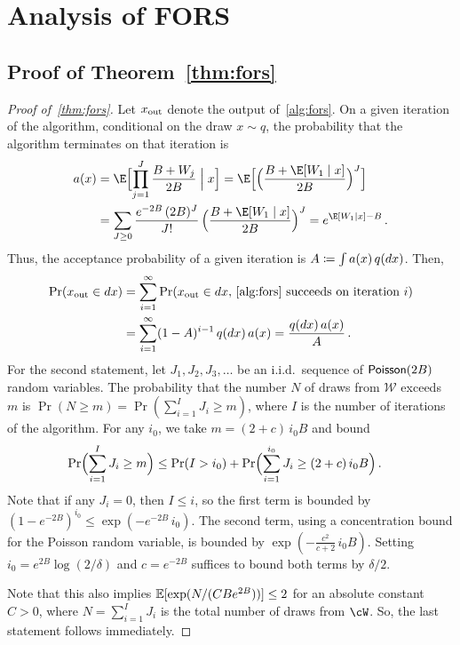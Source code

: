 \section{Analysis of FORS}


\subsection{Proof of Theorem~\ref{thm:fors}}


\begin{proof}[Proof of~\cref{thm:fors}]
    Let $x_{\rm out}$ denote the output of~\cref{alg:fors}.
    On a given iteration of the algorithm, conditional on the draw $x\sim q$, the probability that the algorithm terminates on that iteration is
    \begin{align*}
        a(x)
        &= \E\Bigl[\prod_{j=1}^J \frac{B+W_j}{2B}\Bigm\vert x\Bigr]
        =\E\Bigl[\Bigl(\frac{B+\E[W_1\mid x]}{2B}\Bigr)^J\Bigr]\\
        &= \sum_{J\geq 0} \frac{e^{-2B}\,(2B)^J}{J!} \,\Bigl(\frac{B+\E[W_1\mid x]}{2B}\Bigr)^J
        = e^{\E[W_1\mid x]-B}\,.
    \end{align*}
    Thus, the acceptance probability of a given iteration is $A \deq \int a(x)\,q(dx)$.
    Then,
    \begin{align*}
        \Pr(x_{\rm out} \in dx)
        &= \sum_{i=1}^\infty \Pr(x_{\rm out} \in dx, \, \text{\cref{alg:fors} succeeds on iteration}~i) \\
        &= \sum_{i=1}^\infty (1-A)^{i-1}\,q(dx)\,a(x)
        = \frac{q(dx)\,a(x)}{A}\,.
    \end{align*}
    For the second statement, let $J_1,J_2,J_3,\dotsc$ be an i.i.d.\ sequence of $\Poi(2B)$ random variables.
    The probability that the number $N$ of draws from $\mathcal W$ exceeds $m$ is $\Pr(N\geq m)=\Pr(\sum_{i=1}^I J_i \ge m)$, where $I$ is the number of iterations of the algorithm.
    For any $i_0$, we take $m = (2+c)\,i_0 B$ and bound
    \begin{align*}
        \Pr\Bigl(\sum_{i=1}^I J_i \ge m\Bigr)
        &\le \Pr(I > i_0) + \Pr\Bigl(\sum_{i=1}^{i_0} J_i \ge (2+c)\,i_0 B\Bigr)\,.
    \end{align*}
    Note that if any $J_i = 0$, then $I \le i$, so the first term is bounded by $(1-e^{-2B})^{i_0} \le \exp(-e^{-2B}\,i_0)$.
    The second term, using a concentration bound for the Poisson random variable, is bounded by $\exp(-\frac{c^2}{c+2}\,i_0 B)$.
    Setting $i_0 = e^{2B} \log(2/\delta)$ and $c=e^{-2B}$ suffices to bound both terms by $\delta/2$.

    Note that this also implies $\En[\exp\prn{N/(CBe^{2B})}]\leq 2$ for an absolute constant $C>0$, where $N=\sum_{i=1}^I J_i$ is the total number of draws from $\cW$.
    So, the last statement follows immediately.
\end{proof}



